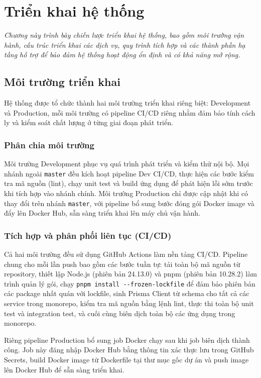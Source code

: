 \chapter{Triển khai hệ thống}
\textit{Chương này trình bày chiến lược triển khai hệ thống, bao gồm môi trường vận hành, cấu trúc triển khai các dịch vụ, quy trình tích hợp và các thành phần hạ tầng hỗ trợ để bảo đảm hệ thống hoạt động ổn định và có khả năng mở rộng.}

\section{Môi trường triển khai}

Hệ thống được tổ chức thành hai môi trường triển khai riêng biệt: Development và Production, mỗi môi trường có pipeline CI/CD riêng nhằm đảm bảo tính cách ly và kiểm soát chất lượng ở từng giai đoạn phát triển.

\subsection{Phân chia môi trường}

Môi trường Development phục vụ quá trình phát triển và kiểm thử nội bộ. Mọi nhánh ngoài \texttt{master} đều kích hoạt pipeline Dev CI/CD, thực hiện các bước kiểm tra mã nguồn (lint), chạy unit test và build ứng dụng để phát hiện lỗi sớm trước khi tích hợp vào nhánh chính. Môi trường Production chỉ được cập nhật khi có thay đổi trên nhánh \texttt{master}, với pipeline bổ sung bước đóng gói Docker image và đẩy lên Docker Hub, sẵn sàng triển khai lên máy chủ vận hành.

\subsection{Tích hợp và phân phối liên tục (CI/CD)}

Cả hai môi trường đều sử dụng GitHub Actions \cite{github_actions} làm nền tảng CI/CD. Pipeline chung cho mỗi lần push bao gồm các bước tuần tự: tải toàn bộ mã nguồn từ repository, thiết lập Node.js (phiên bản 24.13.0) và pnpm (phiên bản 10.28.2) làm trình quản lý gói, chạy \texttt{pnpm install -{}-frozen-lockfile} để đảm bảo phiên bản các package nhất quán với lockfile, sinh Prisma Client từ schema cho tất cả các service trong monorepo, kiểm tra mã nguồn bằng lệnh lint, thực thi toàn bộ unit test và integration test, và cuối cùng biên dịch toàn bộ các ứng dụng trong monorepo.

Riêng pipeline Production bổ sung job Docker chạy sau khi job biên dịch thành công. Job này đăng nhập Docker Hub bằng thông tin xác thực lưu trong GitHub Secrets, build Docker image từ Dockerfile tại thư mục gốc dự án và push image lên Docker Hub để sẵn sàng triển khai.

